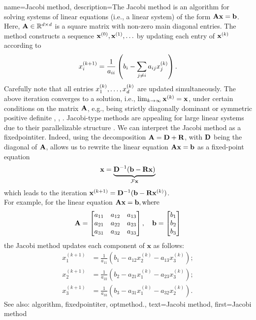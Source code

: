 {name={Jacobi method},
	description={The Jacobi method is an \gls{algorithm}  
		for solving systems of linear equations (i.e., a linear system) of the form ${\bf A}{\bf x}= \mathbf{b}$.  
		Here, ${\bf A} \in \mathbb{R}^{d \times d}$ is a square matrix with 
		non-zero main diagonal entries. The method constructs a sequence ${\bf x}^{(0)}, {\bf x}^{(1)}, \ldots$ 
		by updating each entry of $\mathbf{x}^{(k)}$ according to 
		\[
		x_i^{(k+1)} = \frac{1}{a_{ii}} \left( b_i - \sum_{j \neq i} a_{ij} x_j^{(k)} \right).
		\]
		Carefully note that all entries $x^{(k)}_{1}, \ldots, x^{(k)}_{d}$ are updated simultaneously.
		The above iteration converges to a solution, i.e., $\lim_{k \rightarrow \infty} {\bf x}^{(k)}={\bf x}$, 
		under certain conditions on the matrix ${\bf A}$, e.g., being strictly 
		diagonally dominant or symmetric positive  definite \cite{GolubVanLoanBook}, \cite{Horn91}, \cite{StrangLinAlg2016}. 
		Jacobi-type methods are appealing for large linear systems due to their parallelizable structure \cite{ParallelDistrBook}.
		We can interpret the Jacobi method as a \gls{fixedpointiter}. Indeed, using the decomposition ${\bf A} = {\bf D} + {\bf R}$, with ${\bf D}$ being the 
		diagonal of ${\bf A}$, allows us to rewrite the linear equation ${\bf A} {\bf x} = {\bf b}$ as a fixed-point equation  
		\[
		\mathbf{x} = \underbrace{{\bf D}^{-1}(\mathbf{b} - {\bf R} \mathbf{x})}_{\mathcal{F} {\bf x}}
		\]
		which leads to the iteration ${\bf x}^{(k+1)} = {\bf D}^{-1}(\mathbf{b} - {\bf R} {\bf x}^{(k)})$.
		\\
		For example, for the linear equation ${\bf A} \mathbf{x} = \mathbf{b}, \text{where}$
		 \[
		 {\bf A} = \begin{bmatrix}
		 	a_{11} & a_{12} & a_{13} \\
		 	a_{21} & a_{22} & a_{23} \\
		 	a_{31} & a_{32} & a_{33}
		 \end{bmatrix}, \quad
		 \mathbf{b} = \begin{bmatrix}
		 	b_1 \\
		 	b_2 \\
		 	b_3
		 \end{bmatrix}
		 \]
		 the Jacobi method updates each component of \( \mathbf{x} \) as follows:
		 \[
		 \begin{aligned}
		 	x_1^{(k+1)} &= \frac{1}{a_{11}} \left( b_1 - a_{12} x_2^{(k)} - a_{13} x_3^{(k)} \right); \\
		 	x_2^{(k+1)} &= \frac{1}{a_{22}} \left( b_2 - a_{21} x_1^{(k)} - a_{23} x_3^{(k)} \right); \\
		 	x_3^{(k+1)} &= \frac{1}{a_{33}} \left( b_3 - a_{31} x_1^{(k)} - a_{32} x_2^{(k)} \right).
		 \end{aligned}
		 \]
		See also: \gls{algorithm}, \gls{fixedpointiter}, \gls{optmethod}.},
	text={Jacobi method}, 
	first={Jacobi method}
}
	
